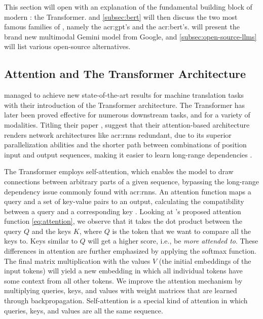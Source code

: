 This section will open with an explanation of the fundamental building block of modern : the Transformer.  and \autoref{subsec:bert} will then discuss the two most famous families of , namely the \acrshort{acr:gpt}'s and the \acrshort{acr:bert}'s.  will present the brand new multimodal Gemini model from Google, and \autoref{subsec:open-source-llms} will list various open-source alternatives.

\subsection{Attention and The Transformer Architecture}\label{subsec:attention-and-transformers}

\cite{vaswaniAttentionAllYou2017} managed to achieve new state-of-the-art results for machine translation tasks with their introduction of the Transformer architecture. The Transformer has later been proved effective for numerous downstream tasks, and for a variety of modalities. Titling their paper , \citeauthor{vaswaniAttentionAllYou2017} suggest that their attention-based architecture renders network architectures like \glspl{acr:rnn} redundant, due to its superior parallelization abilities and the shorter path between combinations of position input and output sequences, making it easier to learn long-range dependencies \citep[6]{vaswaniAttentionAllYou2017}.

The Transformer employs self-attention, which enables the model to draw connections between arbitrary parts of a given sequence, bypassing the long-range dependency issue commonly found with \glspl{acr:rnn}. An attention function maps a query and a set of key-value pairs to an output, calculating the compatibility between a query and a corresponding key \citep[3]{vaswaniAttentionAllYou2017}. Looking at \citeauthor{vaswaniAttentionAllYou2017}'s proposed attention function \eqref{eq:attention}, we observe that it takes the dot product between the query $Q$ and the keys $K$, where $Q$ is the token that we want to compare all the keys to. Keys similar to $Q$ will get a higher score, i.e., be \textit{more attended to}. These differences in attention are further emphasized by applying the softmax function. The final matrix multiplication with the values $V$ (the initial embeddings of the input tokens) will yield a new embedding in which all individual tokens have some context from all other tokens. We improve the attention mechanism by multiplying queries, keys, and values with weight matrices that are learned through backpropagation. Self-attention is a special kind of attention in which queries, keys, and values are all the same sequence.

